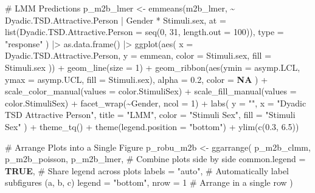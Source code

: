\documentclass[
  bookmarksnumbered]{article}
\newenvironment{Shaded}{\begin{snugshade}}{\end{snugshade}}
\newcommand{\AttributeTok}[1]{\textcolor[rgb]{0.80,0.80,0.80}{#1}}
\newcommand{\CommentTok}[1]{\textcolor[rgb]{0.50,0.62,0.50}{#1}}
\newcommand{\ConstantTok}[1]{\textcolor[rgb]{0.86,0.64,0.64}{\textbf{#1}}}
\newcommand{\DecValTok}[1]{\textcolor[rgb]{0.86,0.86,0.80}{#1}}
\newcommand{\FloatTok}[1]{\textcolor[rgb]{0.75,0.75,0.82}{#1}}
\newcommand{\FunctionTok}[1]{\textcolor[rgb]{0.94,0.94,0.56}{#1}}
\newcommand{\NormalTok}[1]{\textcolor[rgb]{0.80,0.80,0.80}{#1}}
\newcommand{\OtherTok}[1]{\textcolor[rgb]{0.94,0.94,0.56}{#1}}
\newcommand{\SpecialCharTok}[1]{\textcolor[rgb]{0.86,0.64,0.64}{#1}}
\newcommand{\StringTok}[1]{\textcolor[rgb]{0.80,0.58,0.58}{#1}}
\begin{document}
\begin{Shaded}
\begin{Highlighting}[]
\CommentTok{\# LMM Predictions}
\NormalTok{p\_m2b\_lmer }\OtherTok{\textless{}{-}} \FunctionTok{emmeans}\NormalTok{(m2b\_lmer, }\SpecialCharTok{\textasciitilde{}}\NormalTok{ Dyadic.TSD.Attractive.Person }\SpecialCharTok{|}\NormalTok{ Gender }\SpecialCharTok{*}\NormalTok{ Stimuli.sex,}
  \AttributeTok{at =} \FunctionTok{list}\NormalTok{(}\AttributeTok{Dyadic.TSD.Attractive.Person =} \FunctionTok{seq}\NormalTok{(}\DecValTok{0}\NormalTok{, }\DecValTok{31}\NormalTok{, }\AttributeTok{length.out =} \DecValTok{100}\NormalTok{)),}
  \AttributeTok{type =} \StringTok{"response"}
\NormalTok{) }\SpecialCharTok{|\textgreater{}}
  \FunctionTok{as.data.frame}\NormalTok{() }\SpecialCharTok{|\textgreater{}}
  \FunctionTok{ggplot}\NormalTok{(}\FunctionTok{aes}\NormalTok{(}
    \AttributeTok{x =}\NormalTok{ Dyadic.TSD.Attractive.Person, }\AttributeTok{y =}\NormalTok{ emmean,}
    \AttributeTok{color =}\NormalTok{ Stimuli.sex, }\AttributeTok{fill =}\NormalTok{ Stimuli.sex}
\NormalTok{  )) }\SpecialCharTok{+}
  \FunctionTok{geom\_line}\NormalTok{(}\AttributeTok{size =} \DecValTok{1}\NormalTok{) }\SpecialCharTok{+}
  \FunctionTok{geom\_ribbon}\NormalTok{(}\FunctionTok{aes}\NormalTok{(}\AttributeTok{ymin =}\NormalTok{ asymp.LCL, }\AttributeTok{ymax =}\NormalTok{ asymp.UCL, }\AttributeTok{fill =}\NormalTok{ Stimuli.sex),}
    \AttributeTok{alpha =} \FloatTok{0.2}\NormalTok{, }\AttributeTok{color =} \ConstantTok{NA}
\NormalTok{  ) }\SpecialCharTok{+}
  \FunctionTok{scale\_color\_manual}\NormalTok{(}\AttributeTok{values =}\NormalTok{ color.StimuliSex) }\SpecialCharTok{+}
  \FunctionTok{scale\_fill\_manual}\NormalTok{(}\AttributeTok{values =}\NormalTok{ color.StimuliSex) }\SpecialCharTok{+}
  \FunctionTok{facet\_wrap}\NormalTok{(}\SpecialCharTok{\textasciitilde{}}\NormalTok{Gender, }\AttributeTok{ncol =} \DecValTok{1}\NormalTok{) }\SpecialCharTok{+}
  \FunctionTok{labs}\NormalTok{(}
    \AttributeTok{y =} \StringTok{""}\NormalTok{, }\AttributeTok{x =} \StringTok{"Dyadic TSD Attractive Person"}\NormalTok{,}
    \AttributeTok{title =} \StringTok{"LMM"}\NormalTok{, }\AttributeTok{color =} \StringTok{"Stimuli Sex"}\NormalTok{, }\AttributeTok{fill =} \StringTok{"Stimuli Sex"}
\NormalTok{  ) }\SpecialCharTok{+}
  \FunctionTok{theme\_tq}\NormalTok{() }\SpecialCharTok{+}
  \FunctionTok{theme}\NormalTok{(}\AttributeTok{legend.position =} \StringTok{"bottom"}\NormalTok{) }\SpecialCharTok{+}
  \FunctionTok{ylim}\NormalTok{(}\FunctionTok{c}\NormalTok{(}\FloatTok{0.3}\NormalTok{, }\FloatTok{6.5}\NormalTok{))}

\CommentTok{\# Arrange Plots into a Single Figure}
\NormalTok{p\_robu\_m2b }\OtherTok{\textless{}{-}} \FunctionTok{ggarrange}\NormalTok{(}
\NormalTok{  p\_m2b\_clmm, p\_m2b\_poisson, p\_m2b\_lmer, }\CommentTok{\# Combine plots side by side}
  \AttributeTok{common.legend =} \ConstantTok{TRUE}\NormalTok{, }\CommentTok{\# Share legend across plots}
  \AttributeTok{labels =} \StringTok{"auto"}\NormalTok{, }\CommentTok{\# Automatically label subfigures (a, b, c)}
  \AttributeTok{legend =} \StringTok{"bottom"}\NormalTok{,}
  \AttributeTok{nrow =} \DecValTok{1} \CommentTok{\# Arrange in a single row}
\NormalTok{)}


\end{Highlighting}
\end{Shaded}
\end{document}
